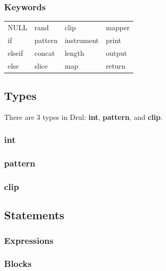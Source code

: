 \documentclass[11pt,twoside]{article}
\begin{document}
\subsubsection{Keywords}


\begin{table}[htb]
\begin{center} 
\begin{tabular}{llll} 
  NULL &    rand &    clip &        mapper \\
  if &      pattern & instrument &  print \\
  elseif &  concat &  length &      output \\
  else &    slice &   map &         return
\end{tabular}
\label{tab:keywords}
\end{center} 
\end{table}



\subsection{Types}

There are $3$ types in Drul: \textbf{int}, \textbf{pattern},
and \textbf{clip}.

\subsubsection{int}

\subsubsection{pattern}

\subsubsection{clip}


\subsection{Statements}

\subsubsection{Expressions}


\subsubsection{Blocks}
\end{document}

